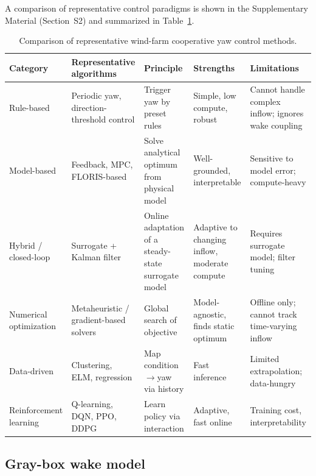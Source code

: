 \documentclass[final,5p,times]{elsarticle}
\begin{document}
A comparison of representative control paradigms is shown in the Supplementary Material (Section~S2) and summarized in Table~\ref{tab:methods}.



\begin{table}[t]
\centering
\caption{Comparison of representative wind-farm cooperative yaw control methods.}
\label{tab:methods}
\small
\begin{tabular}{p{2.2cm}p{3.0cm}p{4.2cm}p{3.0cm}p{3.0cm}}
\toprule
Category & Representative algorithms & Principle & Strengths & Limitations \\
\midrule
Rule-based & Periodic yaw, direction-threshold control & Trigger yaw by preset rules & Simple, low compute, robust & Cannot handle complex inflow; ignores wake coupling \\
Model-based & Feedback, MPC, FLORIS-based & Solve analytical optimum from physical model & Well-grounded, interpretable & Sensitive to model error; compute-heavy \\
Hybrid / closed-loop & Surrogate + Kalman filter~\citep{Doekemeijer2019} & Online adaptation of a steady-state surrogate model & Adaptive to changing inflow, moderate compute & Requires surrogate model; filter tuning \\
Numerical optimization & Metaheuristic / gradient-based solvers & Global search of objective & Model-agnostic, finds static optimum & Offline only; cannot track time-varying inflow \\
Data-driven & Clustering, ELM, regression & Map condition$\rightarrow$yaw via history & Fast inference & Limited extrapolation; data-hungry \\
Reinforcement learning & Q-learning, DQN, PPO, DDPG & Learn policy via interaction & Adaptive, fast online & Training cost, interpretability \\
\bottomrule
\end{tabular}
\end{table}

\subsection{Gray-box wake model}\label{sec:wake}
\end{document}

